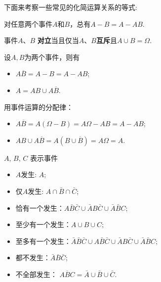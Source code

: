 下面来考察一些常见的化简运算关系的等式: 

\begin{proposition}
        对任意两个事件$A$和$B$，总有$ A-B=A-AB$. 
\end{proposition}

\begin{proposition}
    事件$A$、$B$ \textbf{对立}当且仅当$A$、$B$\textbf{互斥}且$A\cup B=\Omega$. 
\end{proposition}
\begin{example}
    设$A,B$为两个事件，则有
        \begin{itemize}
            \item $A\overline{B}=A-B=A-AB$; 
            \item $A=AB\cup A\overline{B}$. 
        \end{itemize}
\end{example}

\begin{solution}
    用事件运算的分配律：
    \begin{itemize}
        \item $A\overline{B}=A(\Omega-B)=A\Omega-AB=A-AB$; 
        \item $AB\cup A\overline{B}=A(B\cup\overline{B})=A\Omega=A$. 
    \end{itemize}
\end{solution}

\begin{example}
    $A$, $B$, $C$ 表示事件
    \begin{itemize}
        \item $A$发生: $A$; 
        \item 仅$A$发生: $A\cap \bar{B}\cap \bar{C}$; 
        \item 恰有一个发生：$A \bar B \bar C\cup \bar AB\bar C\cup \bar A\bar BC$;
        \item 至少有一个发生：$A\cup B\cup C$;
        \item 至多有一个发生：$\bar A\bar B\bar C\cup A \bar B \bar C \cup \bar AB\bar C\cup \bar A\bar BC$;
        \item 都不发生：$\bar A\bar B\bar C$;
        \item 不全部发生： $\overline{ABC}=\bar A\cup \bar B\cup \bar C$.
    \end{itemize}
\end{example}

